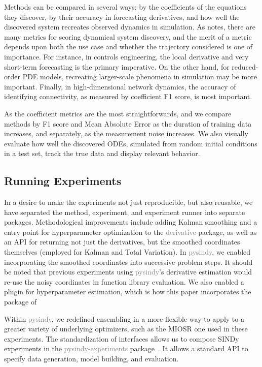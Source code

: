 \documentclass{ACCESS_latex_template_20231118/ieeeaccess}
\newcommand{\gray}[1]{\textcolor{gray}{#1}}
\begin{document}
Methods can be compared in several ways: by the coefficients of the equations they discover, by their accuracy in forecasting derivatives, and how well the discovered system recreates observed dynamics in simulation.  As \cite{Gilpin2023} notes, there are many metrics for scoring dynamical system discovery, and the merit of a metric depends upon both the use case and whether the trajectory considered is one of importance.  For instance, in controls engineering, the local derivative and very short-term forecasting is the primary imperative.  On the other hand, for reduced-order PDE models, recreating larger-scale phenomena in simulation may be more important.  Finally, in high-dimensional network dynamics, the accuracy of identifying connectivity, as measured by coefficient F1 score, is most important.

As the coefficient metrics are the most straightforwards, and we compare methods by F1 score and Mean Absolute Error as the duration of training data increases, and separately, as the measurement noise increases.  We also visually evaluate how well the discovered ODEs, simulated from random initial conditions in a test set, track the true data and display relevant behavior.

\subsection{Running Experiments}

In a desire to make the experiments not just reproducible, but also reusable, we have separated the method, experiment, and experiment runner into separate packages.
Methodological improvements include adding Kalman smoothing and a entry point for hyperparameter optimization to the \gray{derivative} package, as well as an API for returning not just the derivatives, but the smoothed coordinates themselves (employed for Kalman and Total Variation).
In \gray{pysindy}, we enabled incorporating the smoothed coordinates into successive problem steps.
It should be noted that previous experiments using \gray{pysindy}'s derivative estimation would re-use the noisy coordinates in function library evaluation.
We also enabled a plugin for hyperparameter estimation, which is how this paper incorporates the package of \cite{Barratt2020}

Within \gray{pysindy}, we redefined ensembling in a more flexible way to apply to a greater variety of underlying optimizers, such as the MIOSR one used in these experiments.  The standardization of interfaces allows us to compose SINDy experiments in the \gray{pysindy-experiments} package~\citep{pysindy-experiments-2024}.  It allows a standard API to specify data generation, model building, and evaluation.
\end{document}
